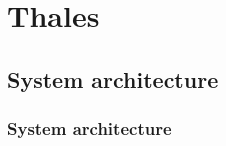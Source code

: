 \section{Thales}
\subsection{System architecture}
\frame
{
  \frametitle{System architecture}
 \begin{center}
      \end{center}
   
}
